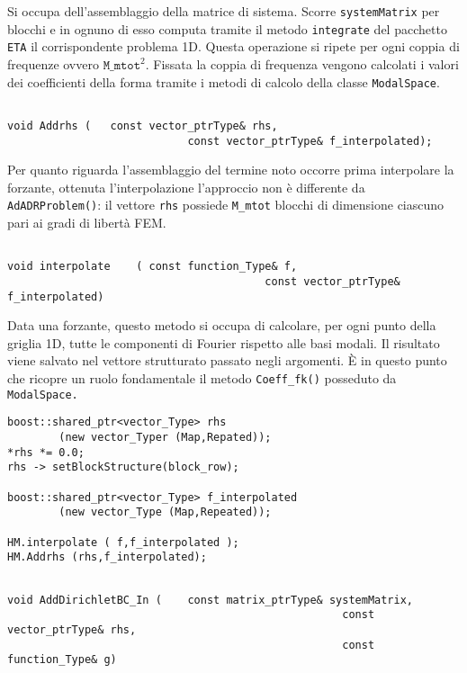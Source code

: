 Si occupa dell'assemblaggio della matrice di sistema. Scorre \texttt{systemMatrix} per blocchi e in ognuno di esso computa tramite il metodo \texttt{integrate} del pacchetto \texttt{ETA} il corrispondente problema 1D. Questa operazione si ripete per ogni coppia di frequenze ovvero $\texttt{M\_mtot}^2$. Fissata la coppia di frequenza vengono calcolati i valori dei coefficienti della forma tramite i metodi di calcolo della classe  \texttt{ModalSpace}.



\begin{lstlisting}[style=general, frame = top]

void Addrhs	(	const vector_ptrType& rhs,
							const vector_ptrType& f_interpolated);
\end{lstlisting}
Per quanto riguarda l'assemblaggio del termine noto occorre prima interpolare la forzante, ottenuta l'interpolazione l'approccio non \`e differente da \texttt{AdADRProblem()}: il vettore \texttt{rhs} possiede \texttt{M\_mtot} blocchi di dimensione ciascuno pari ai gradi di libert\`a FEM.

\begin{lstlisting}[style = general, frame = top]

void interpolate	( const function_Type& f,
										const vector_ptrType& f_interpolated)
\end{lstlisting}

Data una forzante, questo metodo si occupa di calcolare, per ogni punto della griglia 1D, tutte le componenti di Fourier rispetto alle basi modali. Il risultato viene salvato nel vettore strutturato passato negli argomenti. \`E in questo punto che ricopre un ruolo fondamentale il metodo \texttt{Coeff\_fk()} posseduto da \texttt{ModalSpace.}

\begin{lstlisting}[style = general]
boost::shared_ptr<vector_Type> rhs 
		(new vector_Typer (Map,Repated));
*rhs *= 0.0;
rhs -> setBlockStructure(block_row);

boost::shared_ptr<vector_Type> f_interpolated 
		(new vector_Type (Map,Repeated));

HM.interpolate ( f,f_interpolated );
HM.Addrhs (rhs,f_interpolated);
\end{lstlisting}


\begin{lstlisting}[style = general,frame = top]

void AddDirichletBC_In (	const matrix_ptrType& systemMatrix,
													const vector_ptrType& rhs,
													const function_Type& g)
\end{lstlisting}

